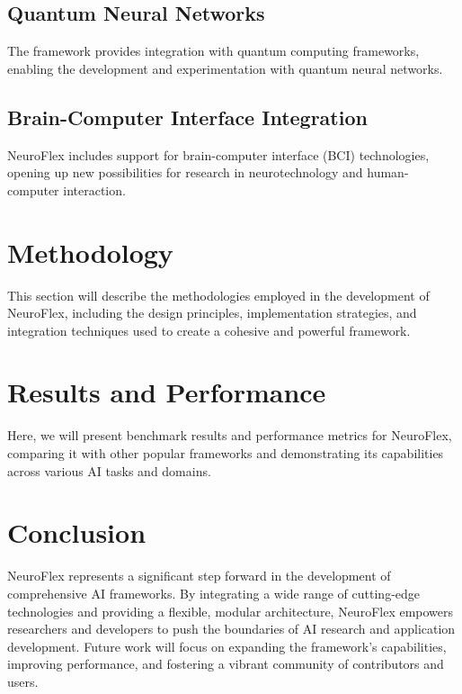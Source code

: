 \documentclass[conference]{IEEEtran}
\begin{document}
\subsection{Quantum Neural Networks}
The framework provides integration with quantum computing frameworks, enabling the development and experimentation with quantum neural networks.

\subsection{Brain-Computer Interface Integration}
NeuroFlex includes support for brain-computer interface (BCI) technologies, opening up new possibilities for research in neurotechnology and human-computer interaction.

\section{Methodology}
This section will describe the methodologies employed in the development of NeuroFlex, including the design principles, implementation strategies, and integration techniques used to create a cohesive and powerful framework.

\section{Results and Performance}
Here, we will present benchmark results and performance metrics for NeuroFlex, comparing it with other popular frameworks and demonstrating its capabilities across various AI tasks and domains.

\section{Conclusion}
NeuroFlex represents a significant step forward in the development of comprehensive AI frameworks. By integrating a wide range of cutting-edge technologies and providing a flexible, modular architecture, NeuroFlex empowers researchers and developers to push the boundaries of AI research and application development. Future work will focus on expanding the framework's capabilities, improving performance, and fostering a vibrant community of contributors and users.



\end{document}
